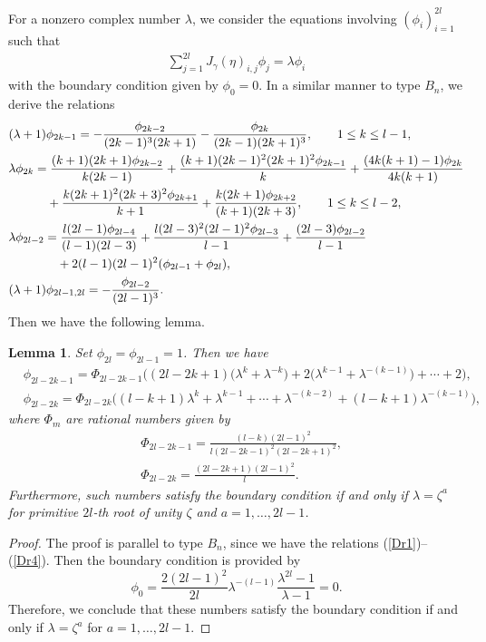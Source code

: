 \documentclass[pdftex]{sigma}
\numberwithin{equation}{section}
\newtheorem{Lemma}[Theorem]{Lemma}
\begin{document}
For a nonzero complex number $\lambda$, we consider the equations involving $(\phi_i)_{i=1}^{2l}$ such that
	\begin{align}\label{Deq}
	\sum_{j=1}^{2l}J_\gamma(\eta)_{i,j}\phi_j=\lambda\phi_i
	\end{align}
with the boundary condition given by $\phi_0=0$.
In a similar manner to type $B_n$, we derive the relations
	\begin{align}
	\label{Dr1}&(\lambda+1)\phi_{2k-1}=-\frac{\phi_{2k-2}}{(2k-1)^3(2k+1)}-\frac{\phi_{2k}}{(2k-1)(2k+1)^3},\qquad 1\leq k\leq l-1,\\
&\lambda\phi_{2k}=\frac{(k+1)(2k+1)\phi_{2k-2}}{k(2k-1)}+\frac{(k+1)(2k-1)^2(2k+1)^2\phi_{2k-1}}{k}+\frac{(4k(k+1)-1)\phi_{2k}}{4k(k+1)}\nonumber\\
	&\hphantom{\lambda\phi_{2k}=}{}
 +\frac{k(2k+1)^2(2k+3)^2\phi_{2k+1}}{k+1}+\frac{k(2k+1)\phi_{2k+2}}{(k+1)(2k+3)},\qquad 1\leq k\leq l-2 ,\label{Dr2}\\
&\lambda\phi_{2l-2}=\frac{l(2l-1)\phi_{2l-4}}{(l-1)(2l-3)}+\frac{l(2l-3)^2(2l-1)^2\phi_{2l-3}}{l-1}+\frac{(2l-3)\phi_{2l-2}}{l-1}\nonumber\\
	&\hphantom{\lambda\phi_{2l-2}=}{}
 +2(l-1)(2l-1)^2(\phi_{2l-1}+\phi_{2l}),\label{Dr3}\\
	\label{Dr4}&(\lambda+1)\phi_{2l-1,2l}=-\frac{\phi_{2l-2}}{(2l-1)^3}.
	\end{align}
Then we have the following lemma.
		\begin{Lemma}\label{D}
		Set $\phi_{2l}=\phi_{2l-1}=1$.
		Then we have
			\begin{align*}
			&\phi_{2l-2k-1}=\Phi_{2l-2k-1}\bigl((2l-2k+1)\bigl(\lambda^k+\lambda^{-k}\bigr)+2\bigl(\lambda^{k-1}+\lambda^{-(k-1)}\bigr)+\cdots+2\bigr),\\
			&\phi_{2l-2k}=\Phi_{2l-2k}\bigl((l-k+1)\lambda^k+\lambda^{k-1}+\cdots+\lambda^{-(k-2)}+(l-k+1)\lambda^{-(k-1)}\bigr),
			\end{align*}
		 where $\Phi_m$ are rational numbers given by
			\begin{align*}
			&\Phi_{2l-2k-1}=\frac{(l-k)(2l-1)^2}{l(2l-2k-1)^2(2l-2k+1)^2},\\
			&\Phi_{2l-2k}=\frac{(2l-2k+1)(2l-1)^2}{l}.
			\end{align*}
		Furthermore, such numbers satisfy the boundary condition if and only if $\lambda=\zeta^a$ for primitive $2l$-th root of unity $\zeta$ and $a=1,\dots,2l-1$.
		\end{Lemma}
		\begin{proof}
		The proof is parallel to type $B_n$, since we have the relations (\ref{Dr1})--(\ref{Dr4}).
		Then the boundary condition is provided by
			\[\phi_0=\frac{2(2l-1)^2}{2l}\lambda^{-(l-1)}\frac{\lambda^{2l}-1}{\lambda-1}=0.\]
		Therefore, we conclude that these numbers satisfy the boundary condition if and only if $\lambda=\zeta^a$ for $a=1,\dots,2l-1$.
		\end{proof}
\end{document}
